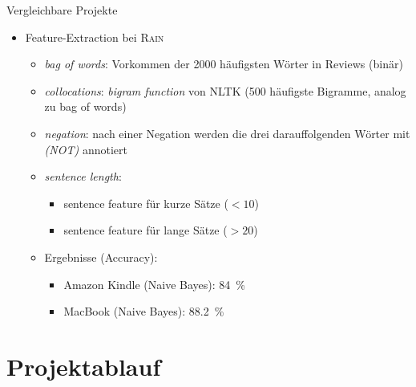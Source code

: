 \documentclass[note=hide]{beamer} %
\newcommand{\feature}[1]{\textcolor{dunkelrot}{\emph{#1}}}
\begin{document}
\begin{frame}{Vergleichbare Projekte}
	\begin{itemize}
		\item Feature-Extraction bei \textsc{Rain}
		\begin{itemize}
			\item \feature{bag of words}: Vorkommen der 2000 häufigsten Wörter in Reviews (binär)
			\item \feature{collocations}: \emph{bigram function} von NLTK (500 häufigste Bigramme, analog zu bag of words)
			\item \feature{negation}: nach einer Negation werden die drei darauffolgenden Wörter mit \emph{(NOT)} annotiert
			\item \feature{sentence length}: 
			\begin{itemize}
				\item sentence feature für kurze Sätze ($<10$)
				\item sentence feature für lange Sätze ($>20$)
			\end{itemize}
		\item Ergebnisse (Accuracy):
			\begin{itemize}
				\item Amazon Kindle (Naive Bayes): \SI{84}{\%}
				\item MacBook (Naive Bayes): \SI{88.2}{\%}
			\end{itemize}
		\end{itemize}
	\end{itemize}
\end{frame}

\section{Projektablauf}
\end{document}
